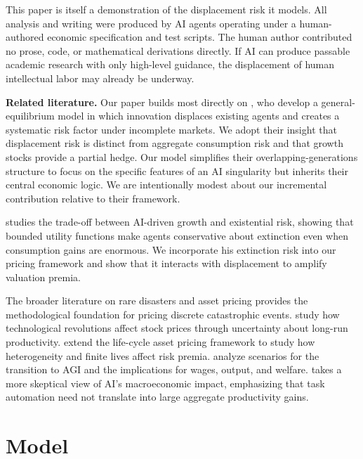 \documentclass[12pt]{article}
\begin{document}
This paper is itself a demonstration of the displacement risk it models. All analysis and writing were produced by AI agents operating under a human-authored economic specification and test scripts. The human author contributed no prose, code, or mathematical derivations directly. If AI can produce passable academic research with only high-level guidance, the displacement of human intellectual labor may already be underway.

\medskip
\noindent\textbf{Related literature.}
Our paper builds most directly on \citet{GKP2012}, who develop a general-equilibrium model in which innovation displaces existing agents and creates a systematic risk factor under incomplete markets. We adopt their insight that displacement risk is distinct from aggregate consumption risk and that growth stocks provide a partial hedge. Our model simplifies their overlapping-generations structure to focus on the specific features of an AI singularity but inherits their central economic logic. We are intentionally modest about our incremental contribution relative to their framework.

\citet{Jones2024} studies the trade-off between AI-driven growth and existential risk, showing that bounded utility functions make agents conservative about extinction even when consumption gains are enormous. We incorporate his extinction risk into our pricing framework and show that it interacts with displacement to amplify valuation premia.

The broader literature on rare disasters and asset pricing \citep{Barro2006,Wachter2013} provides the methodological foundation for pricing discrete catastrophic events. \citet{PastorVeronesi2009} study how technological revolutions affect stock prices through uncertainty about long-run productivity. \citet{GarleanuPanageas2015} extend the life-cycle asset pricing framework to study how heterogeneity and finite lives affect risk premia. \citet{KorinekSuh2024} analyze scenarios for the transition to AGI and the implications for wages, output, and welfare. \citet{Acemoglu2024} takes a more skeptical view of AI's macroeconomic impact, emphasizing that task automation need not translate into large aggregate productivity gains.

\section{Model} %
\end{document}
